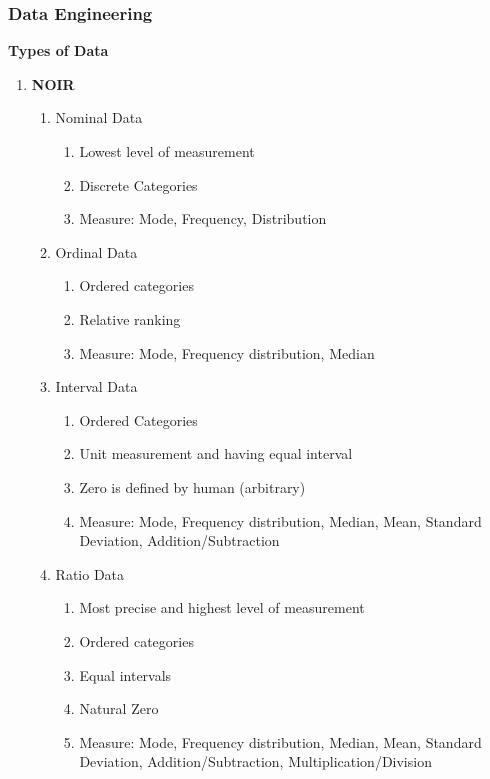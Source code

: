 \subsubsection{Data Engineering}
\textbf{Types of Data}
\begin{enumerate}
    \item \textbf{NOIR}
    \begin{enumerate}
        \item Nominal Data
        \begin{enumerate}
            \item Lowest level of measurement
            \item Discrete Categories
            \item Measure: Mode, Frequency, Distribution
        \end{enumerate}
        \item Ordinal Data
        \begin{enumerate}
            \item Ordered categories
            \item Relative ranking
            \item Measure: Mode, Frequency distribution, Median
        \end{enumerate}
        \item Interval Data
        \begin{enumerate}
            \item Ordered Categories
            \item Unit measurement and having equal interval
            \item Zero is defined by human (arbitrary)
            \item Measure: Mode, Frequency distribution, Median, Mean, Standard Deviation, Addition/Subtraction
        \end{enumerate}
        \item Ratio Data
        \begin{enumerate}
            \item Most precise and highest level of measurement
            \item Ordered categories
            \item Equal intervals
            \item Natural Zero
            \item Measure: Mode, Frequency distribution, Median, Mean, Standard Deviation, Addition/Subtraction, Multiplication/Division
        \end{enumerate}

\end{enumerate}
\end{enumerate}
